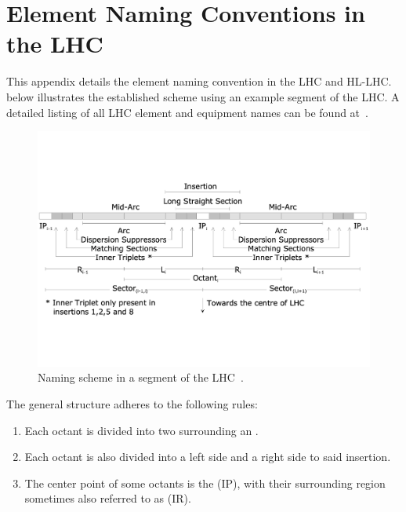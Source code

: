 \chapter{Element Naming Conventions in the LHC}
\label{appendix:naming_conventions}


This appendix details the element naming convention in the LHC and HL-LHC.
 below illustrates the established scheme using an example segment of the LHC.
A detailed listing of all LHC element and equipment names can be found at~\cite{CERN:Equipment_Codes}.

\begin{figure}[h]
    \centering
    \includegraphics*[width=0.9\linewidth]{Figures/Appendices/LHC_naming_scheme.pdf}
    \caption{Naming scheme in a segment of the LHC~\cite{CERN:Element_Naming}.}
    \label{figure:lhc_segment_naming_scheme}
\end{figure}

The general structure adheres to the following rules:
\begin{enumerate}
    \item Each octant is divided into two  surrounding an .
    \item Each octant is also divided into a left side and a right side to said insertion.
    \item The center point of some octants is the  (IP), with their surrounding region sometimes also referred to as  (IR).
\end{enumerate}

